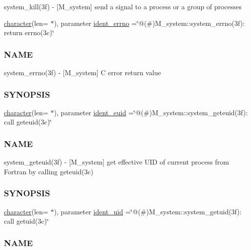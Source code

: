 \begin{DoxyCompactItemize}
\begin{DoxyCompactList}
system\+\_\+kill(3f) -\/ \mbox{[}M\+\_\+system\mbox{]} send a signal to a process or a group of processes \end{DoxyCompactList}\item 
\hyperlink{option__stopwatch_83_8txt_abd4b21fbbd175834027b5224bfe97e66}{character}(len= $\ast$), parameter \hyperlink{namespacem__system_af87dabd7c9a2c38ccb3794b5185f24d8}{ident\+\_\+errno} =\char`\"{}@(\#)M\+\_\+system\+::system\+\_\+errno(3f)\+: return errno(3c)\char`\"{}
\begin{DoxyCompactList}\small\item\em \subsubsection*{N\+A\+ME}

system\+\_\+errno(3f) -\/ \mbox{[}M\+\_\+system\mbox{]} C error return value \subsubsection*{S\+Y\+N\+O\+P\+S\+IS}\end{DoxyCompactList}\item 
\hyperlink{option__stopwatch_83_8txt_abd4b21fbbd175834027b5224bfe97e66}{character}(len= $\ast$), parameter \hyperlink{namespacem__system_a20fffb77817fdd355846c7d6f21f5a15}{ident\+\_\+euid} =\char`\"{}@(\#)M\+\_\+system\+::system\+\_\+geteuid(3f)\+: call geteuid(3c)\char`\"{}
\begin{DoxyCompactList}\small\item\em \subsubsection*{N\+A\+ME}

system\+\_\+geteuid(3f) -\/ \mbox{[}M\+\_\+system\mbox{]} get effective U\+ID of current process from Fortran by calling geteuid(3c) \subsubsection*{S\+Y\+N\+O\+P\+S\+IS}\end{DoxyCompactList}\item 
\hyperlink{option__stopwatch_83_8txt_abd4b21fbbd175834027b5224bfe97e66}{character}(len= $\ast$), parameter \hyperlink{namespacem__system_ab80f033f884f3c88c3c010826143b6f5}{ident\+\_\+uid} =\char`\"{}@(\#)M\+\_\+system\+::system\+\_\+getuid(3f)\+: call getuid(3c)\char`\"{}
\begin{DoxyCompactList}\small\item\em \subsubsection*{N\+A\+ME}


\end{DoxyCompactList}
\end{DoxyCompactItemize}
